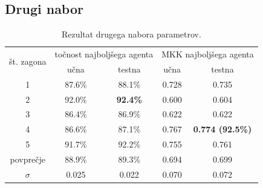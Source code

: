 \subsection{Drugi nabor}\label{subsec:dodatek-statlog-drugi-nabor}
\begin{table}[H]
    \begin{center}
        \begin{tabular}{|| c | c c || c c ||}
            \hline
            \multirow{2}{*}{št. zagona} & \multicolumn{2}{c||}{točnost najboljšega agenta} & \multicolumn{2}{c||}{MKK najboljšega agenta} \\ \cline{2-5}
            & učna   & testna          & učna  & testna                  \\
            \hline
            1         & 87.6\% & 88.1\%          & 0.728 & 0.735                   \\
            \hline
            2         & 92.0\% & \textbf{92.4\%} & 0.600 & 0.604                   \\
            \hline
            3         & 86.4\% & 86.9\%          & 0.622 & 0.622                   \\
            \hline
            4         & 86.6\% & 87.1\%          & 0.767 & \textbf{0.774 (92.5\%)} \\
            \hline
            5         & 91.7\% & 92.2\%          & 0.755 & 0.761                   \\
            \hline
            povprečje & 88.9\% & 89.3\%          & 0.694 & 0.699                   \\
            \hline
            $\sigma$  & 0.025  & 0.022           & 0.070 & 0.072                   \\
            \hline
        \end{tabular}
    \end{center}
    \caption{Rezultat drugega nabora parametrov.}
    \label{tab:statlog_result_2}
\end{table}

